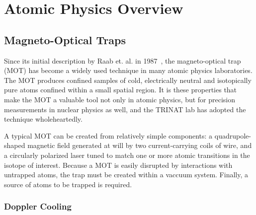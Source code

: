 %
%
%
\clearpage
\chapter{Atomic Physics Overview}
\label{atomicphysics_chapter}
\section{Magneto-Optical Traps}
Since its initial description by Raab et. al. in 1987~\cite{raabprentiss}, the magneto-optical trap (MOT) has become a widely used technique in many atomic physics laboratories.  The MOT produces confined samples of cold, electrically neutral and isotopically pure atoms confined within a small spatial region.  It is these properties that make the MOT a valuable tool not only in atomic physics, but for precision measurements in nuclear physics as well, and the TRINAT lab  has adopted the technique wholeheartedly.

A typical MOT can be created from relatively simple components:  a quadrupole-shaped magnetic field generated at will by two current-carrying coils of wire, and a circularly polarized laser tuned to match one or more atomic transitions in the isotope of interest.  Because a MOT is easily disrupted by interactions with untrapped atoms, the trap must be created within a vaccuum system.  Finally, a source of atoms to be trapped is required.  




	\subsection{Doppler Cooling}
